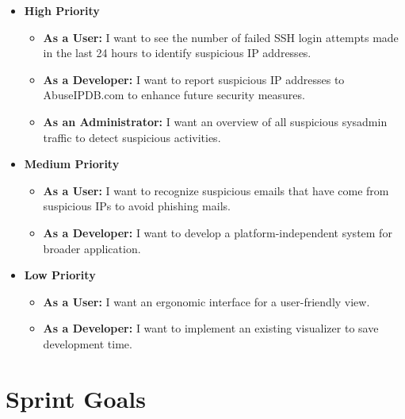 \documentclass[11pt,a4paper]{article}
\begin{document}
    \begin{itemize}
        \item \textbf{High Priority}
        \begin{itemize}
            \item \textbf{As a User:} I want to see the number of failed SSH login attempts made in the last 24 hours to identify suspicious IP addresses.
            \item \textbf{As a Developer:} I want to report suspicious IP addresses to AbuseIPDB.com to enhance future security measures.
            \item \textbf{As an Administrator:} I want an overview of all suspicious sysadmin traffic to detect suspicious activities.
        \end{itemize}

        \item \textbf{Medium Priority}
        \begin{itemize}
            \item \textbf{As a User:} I want to recognize suspicious emails that have come from suspicious IPs to avoid phishing mails.
            \item \textbf{As a Developer:} I want to develop a platform-independent system for broader application.
        \end{itemize}

        \item \textbf{Low Priority}
        \begin{itemize}
            \item \textbf{As a User:} I want an ergonomic interface for a user-friendly view.
            \item \textbf{As a Developer:} I want to implement an existing visualizer to save development time.
        \end{itemize}
    \end{itemize}

    \section{Sprint Goals}\label{sec:sprint-goals}
\end{document}

